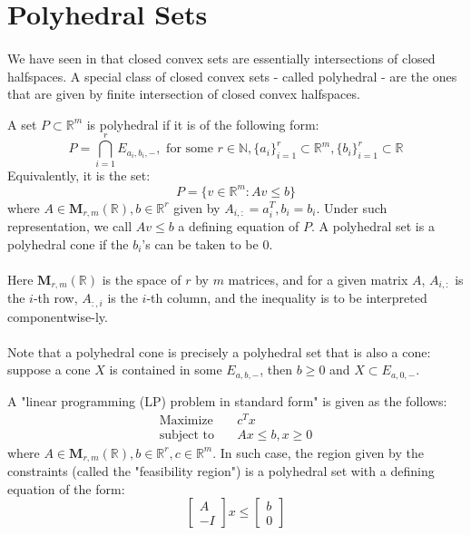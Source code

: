 \section{Polyhedral Sets}
\label{sect:017}

\paragraph{}We have seen in  that closed convex sets are essentially intersections of closed halfspaces. A special class of closed convex sets - called polyhedral - are the ones that are given by finite intersection of closed convex halfspaces.

\begin{defn}\label{defn:017-polyhedral-sets}
	A set $P\subset \mathbb{R}^m$ is polyhedral if it is of the following form:
	\[
		P=\bigcap_{i=1}^rE_{a_i,b_i,-},\text{ for some }r\in \mathbb{N},\{a_i\}_{i=1}^r\subset\mathbb{R}^m,\{b_i\}_{i=1}^r\subset\mathbb{R}
	\]
	Equivalently, it is the set:
	\[
		P=\{v\in \mathbb{R}^m:Av\leq b\}
	\]
	where $A\in \mathbf{M}_{r,m}(\mathbb{R}),b\in \mathbb{R}^r$ given by $A_{i,:}=a_i^T,b_i=b_i$. Under such representation, we call $Av\leq b$ a defining equation of $P$. A polyhedral set is a polyhedral cone if the $b_i$'s can be taken to be $0$.
\end{defn}

\paragraph{}Here $\mathbf{M}_{r,m}(\mathbb{R})$ is the space of $r$ by $m$ matrices, and for a given matrix $A$, $A_{i,:}$ is the $i$-th row, $A_{:,i}$ is the $i$-th column, and the inequality is to be interpreted componentwise-ly.

\paragraph{}Note that a polyhedral cone is precisely a polyhedral set that is also a cone: suppose a cone $X$ is contained in some $E_{a,b,-}$, then $b\geq 0$ and $X\subset E_{a,0,-}$.

\begin{exmp}
	A "linear programming (LP) problem in standard form" is given as the follows:
	\begin{align*}
		\text{Maximize}\quad   & c^Tx              \\
		\text{subject to}\quad & Ax\leq b, x\geq 0
	\end{align*}
	where $A\in \mathbf{M}_{r,m}(\mathbb{R}),b\in \mathbb{R}^r,c\in \mathbb{R}^m$. In such case, the region given by the constraints (called the "feasibility region") is a polyhedral set with a defining equation of the form:
	\[
		\left[
			\begin{array}{r}
				A \\\hline
				-I
			\end{array}
			\right]
		x\leq
		\left[
			\begin{array}{r}
				b \\\hline
				0
			\end{array}
			\right]
	\]
\end{exmp}

